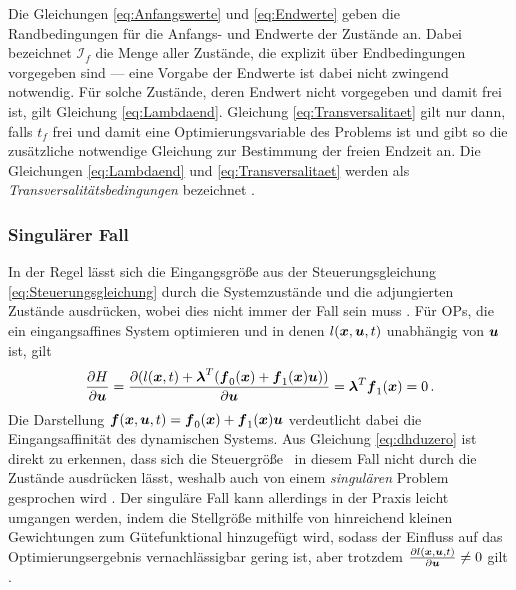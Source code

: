Die Gleichungen \eqref{eq:Anfangswerte} und \eqref{eq:Endwerte} geben die Randbedingungen für die Anfangs- und Endwerte der Zustände an. Dabei bezeichnet $\mathcal{I}_f$ die Menge aller Zustände, die explizit über Endbedingungen vorgegeben sind --- eine Vorgabe der Endwerte ist dabei nicht zwingend notwendig. Für solche Zustände, deren Endwert nicht vorgegeben und damit frei ist, gilt Gleichung \eqref{eq:Lambdaend}. Gleichung \eqref{eq:Transversalitaet} gilt nur dann, falls $t_f$ frei und damit eine Optimierungsvariable des Problems ist und gibt so die zusätzliche notwendige Gleichung zur Bestimmung der freien Endzeit an. Die Gleichungen \eqref{eq:Lambdaend} und \eqref{eq:Transversalitaet} werden als \textit{Transversalitätsbedingungen} bezeichnet \cite{KnutGraichen.2012}. 
\subsubsection{Singulärer Fall}\label{subsubsec:Singularität}
In der Regel lässt sich die Eingangsgröße aus der Steuerungsgleichung \eqref{eq:Steuerungsgleichung} durch die Systemzustände und die adjungierten Zustände ausdrücken, wobei dies nicht immer der Fall sein muss \cite{KnutGraichen.2012}. Für \gls{OP}s, die ein eingangsaffines System optimieren und in denen $l(\boldsymbol{x},\boldsymbol{u},t)$ unabhängig von $\boldsymbol{u}$ ist, gilt 
\begin{equation}
	\frac{\partial H}{\partial \boldsymbol{u}} = \frac{\partial (l(\boldsymbol{x},t) + \boldsymbol{\lambda}^T(\boldsymbol{f}_0(\boldsymbol{x})+\boldsymbol{f}_1(\boldsymbol{x})\boldsymbol{u}))}{\partial \boldsymbol{u}} = \boldsymbol{\lambda}^T\boldsymbol{f}_1(\boldsymbol{x}) = 0 \,. \label{eq:dhduzero}
\end{equation}
Die Darstellung $\boldsymbol{f}(\boldsymbol{x},\boldsymbol{u},t) = \boldsymbol{f}_0(\boldsymbol{x})+\boldsymbol{f}_1(\boldsymbol{x})\boldsymbol{u}$ verdeutlicht dabei die Eingangsaffinität des dynamischen Systems. Aus Gleichung \eqref{eq:dhduzero} ist direkt zu erkennen, dass sich die Steuergröße \uoft~in diesem Fall nicht durch die Zustände ausdrücken lässt, weshalb auch von einem \textit{singulären} Problem gesprochen wird \cite{KnutGraichen.2012}. Der singuläre Fall kann allerdings in der Praxis leicht umgangen werden, indem die Stellgröße mithilfe von hinreichend kleinen Gewichtungen zum Gütefunktional hinzugefügt wird, sodass der Einfluss auf das Optimierungsergebnis vernachlässigbar gering ist, aber trotzdem $\frac{\partial l(\boldsymbol{x},\boldsymbol{u},t)}{\partial \boldsymbol{u}} \neq 0$ gilt \cite{KnutGraichen.2012}.
